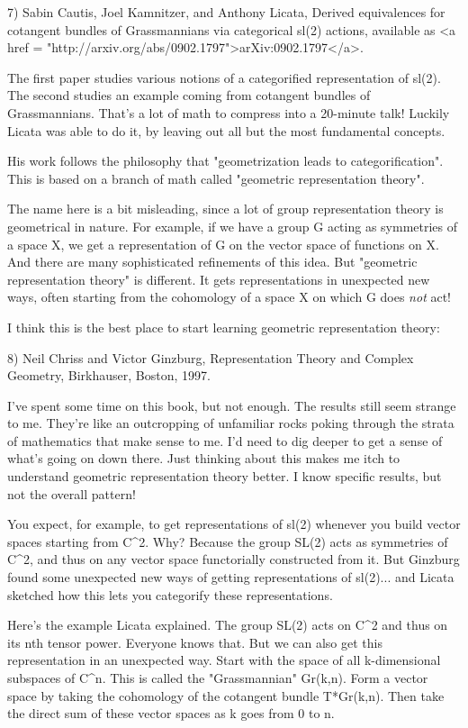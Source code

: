 7) Sabin Cautis, Joel Kamnitzer, and Anthony Licata, Derived
equivalences for cotangent bundles of Grassmannians via categorical
sl(2) actions, available as 
<a href = "http://arxiv.org/abs/0902.1797">arXiv:0902.1797</a>.

The first paper studies various notions of a categorified
representation of sl(2).  The second studies an example coming from
cotangent bundles of Grassmannians.  That's a lot of math to compress
into a 20-minute talk!  Luckily Licata was able to do it, by leaving
out all but the most fundamental concepts.

His work follows the philosophy that "geometrization leads to
categorification".  This is based on a branch of math called
"geometric representation theory".  

The name here is a bit misleading, since a lot of group representation
theory is geometrical in nature.  For example, if we have a group G
acting as symmetries of a space X, we get a representation of G on the
vector space of functions on X.  And there are many sophisticated
refinements of this idea.  But "geometric representation
theory" is different.  It gets representations in unexpected new
ways, often starting from the cohomology of a space X on which G does
\emph{not} act!

I think this is the best place to start learning geometric
representation theory:

8) Neil Chriss and Victor Ginzburg, Representation Theory and Complex
Geometry, Birkhauser, Boston, 1997.

I've spent some time on this book, but not enough.  The results still
seem strange to me.  They're like an outcropping of unfamiliar rocks
poking through the strata of mathematics that make sense to me.  I'd
need to dig deeper to get a sense of what's going on down there.  Just
thinking about this makes me itch to understand geometric
representation theory better.  I know specific results, but not the
overall pattern!

You expect, for example, to get representations of sl(2) whenever you
build vector spaces starting from C^{2}.  Why?  Because the
group SL(2) acts as symmetries of C^{2}, and thus on any
vector space functorially constructed from it.  But Ginzburg found
some unexpected new ways of getting representations of sl(2)... and
Licata sketched how this lets you categorify these representations.

Here's the example Licata explained.  The group SL(2) acts on
C^{2} and thus on its nth tensor power.  Everyone knows that.
But we can also get this representation in an unexpected way.  Start
with the space of all k-dimensional subspaces of C^{n}.  This
is called the "Grassmannian" Gr(k,n).  Form a vector space
by taking the cohomology of the cotangent bundle T*Gr(k,n).  Then take
the direct sum of these vector spaces as k goes from 0 to n.

